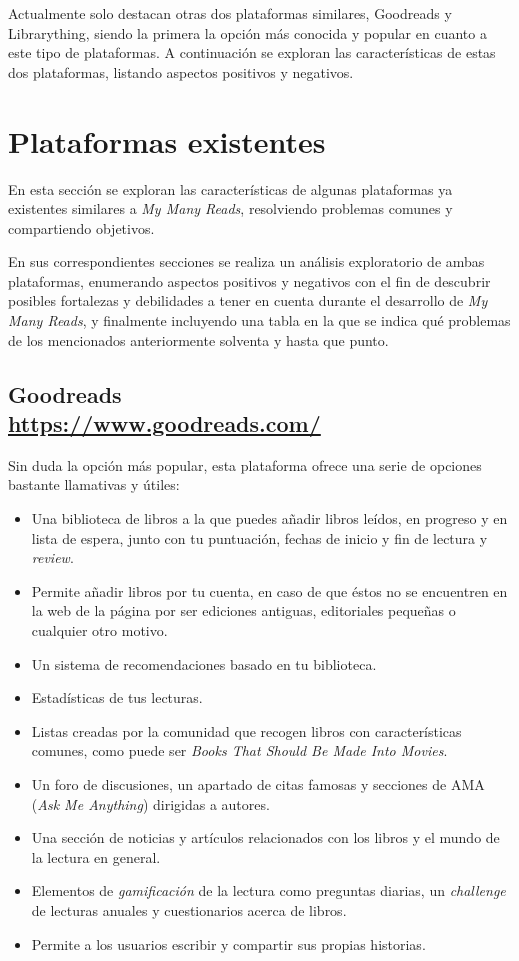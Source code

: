 Actualmente solo destacan otras dos plataformas similares, Goodreads y Librarything, siendo la primera la opción más conocida y popular en cuanto a este tipo de plataformas. A continuación se exploran las características de estas dos plataformas, listando aspectos positivos y negativos.

\section{Plataformas existentes}

En esta sección se exploran las características de algunas plataformas ya existentes similares a \textit{My Many Reads}, resolviendo problemas comunes y compartiendo objetivos.

En sus correspondientes secciones se realiza un análisis exploratorio de ambas plataformas, enumerando aspectos positivos y negativos con el fin de descubrir posibles fortalezas y debilidades a tener en cuenta durante el desarrollo de \textit{My Many Reads}, y finalmente incluyendo una tabla en la que se indica qué problemas de los mencionados anteriormente solventa y hasta que punto.

\subsection[Goodreads]{Goodreads\\ {\large \url{https://www.goodreads.com/}}}

Sin duda la opción más popular, esta plataforma ofrece una serie de opciones bastante llamativas y útiles:

\begin{itemize}
    \item Una biblioteca de libros a la que puedes añadir libros leídos, en progreso y en lista de espera, junto con tu puntuación, fechas de inicio y fin de lectura y \textit{review}.
    \item Permite añadir libros por tu cuenta, en caso de que éstos no se encuentren en la web de la página por ser ediciones antiguas, editoriales pequeñas o cualquier otro motivo.
    \item Un sistema de recomendaciones basado en tu biblioteca.
    \item Estadísticas de tus lecturas.
    \item Listas creadas por la comunidad que recogen libros con características comunes, como puede ser \textit{Books That Should Be Made Into Movies}.
    \item Un foro de discusiones, un apartado de citas famosas y secciones de AMA (\textit{Ask Me Anything}) dirigidas a autores.
    \item Una sección de noticias y artículos relacionados con los libros y el mundo de la lectura en general.
    \item Elementos de \textit{gamificación} de la lectura como preguntas diarias, un \textit{challenge} de lecturas anuales y cuestionarios acerca de libros.
    \item Permite a los usuarios escribir y compartir sus propias historias.
\end{itemize}

